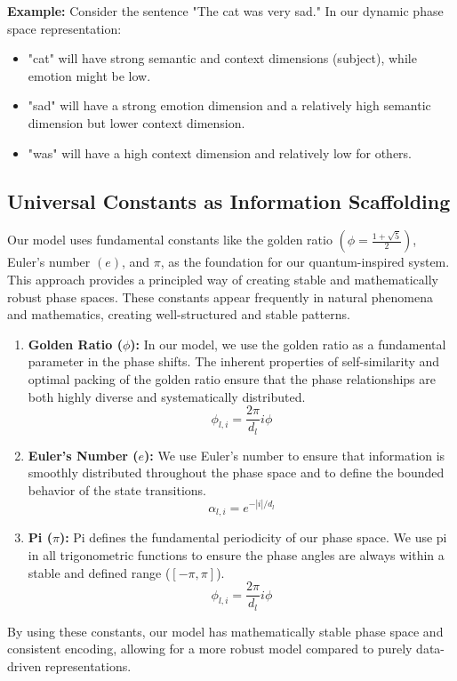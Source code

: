 \documentclass[11pt, a4paper]{article}
\begin{document}
\textbf{Example:} Consider the sentence "The cat was very sad." In our dynamic phase space representation:
\begin{itemize}
    \item "cat" will have strong semantic and context dimensions (subject), while emotion might be low.
    \item "sad" will have a strong emotion dimension and a relatively high semantic dimension but lower context dimension.
    \item "was" will have a high context dimension and relatively low for others.
\end{itemize}

\subsection{Universal Constants as Information Scaffolding}

Our model uses fundamental constants like the golden ratio $(\phi = \frac{1 + \sqrt{5}}{2})$, Euler's number $(e)$, and $\pi$, as the foundation for our quantum-inspired system. This approach provides a principled way of creating stable and mathematically robust phase spaces. These constants appear frequently in natural phenomena and mathematics, creating well-structured and stable patterns.
\begin{enumerate}
    \item \textbf{Golden Ratio ($\phi$):} In our model, we use the golden ratio as a fundamental parameter in the phase shifts. The inherent properties of self-similarity and optimal packing of the golden ratio ensure that the phase relationships are both highly diverse and systematically distributed.
        $$
        \phi_{l,i} = \frac{2\pi}{d_l} i \phi
        $$
    \item \textbf{Euler's Number ($e$):} We use Euler's number to ensure that information is smoothly distributed throughout the phase space and to define the bounded behavior of the state transitions.
        $$
        \alpha_{l,i} = e^{-|i|/d_l}
        $$
    \item \textbf{Pi ($\pi$):} Pi defines the fundamental periodicity of our phase space. We use pi in all trigonometric functions to ensure the phase angles are always within a stable and defined range ($[-\pi, \pi]$).
        $$
        \phi_{l,i} = \frac{2\pi}{d_l} i \phi
        $$
\end{enumerate}

By using these constants, our model has mathematically stable phase space and consistent encoding, allowing for a more robust model compared to purely data-driven representations.
\end{document}
